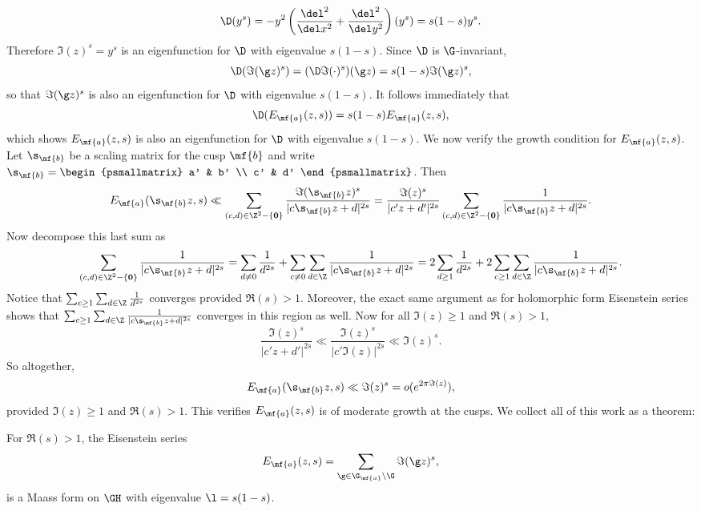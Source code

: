     \[
      \D(y^{s}) = -y^{2}\left(\frac{\del^{2}}{\del x^{2}}+\frac{\del^{2}}{\del y^{2}}\right)(y^{s}) = s(1-s)y^{s}.
    \]
    Therefore $\Im(z)^{s} = y^{s}$ is an eigenfunction for $\D$ with eigenvalue $s(1-s)$. Since $\D$ is $\G$-invariant,
    \[
      \D(\Im(\g z)^{s}) = (\D\Im(\cdot)^{s})(\g z) = s(1-s)\Im(\g z)^{s},
    \]
    so that $\Im(\g z)^{s}$ is also an eigenfunction for $\D$ with eigenvalue $s(1-s)$. It follows immediately that
    \[
      \D(E_{\mf{a}}(z,s)) = s(1-s)E_{\mf{a}}(z,s),
    \]
    which shows $E_{\mf{a}}(z,s)$ is also an eigenfunction for $\D$ with eigenvalue $s(1-s)$. We now verify the growth condition for $E_{\mf{a}}(z,s)$. Let $\s_{\mf{b}}$ be a scaling matrix for the cusp $\mf{b}$ and write $\s_{\mf{b}} = \begin{psmallmatrix} a' & b' \\ c' & d' \end{psmallmatrix}$. Then
    \[
      E_{\mf{a}}(\s_{\mf{b}}z,s) \ll \sum_{(c,d) \in \Z^{2}-\{\mathbf{0}\}}\frac{\Im(\s_{\mf{b}}z)^{s}}{|c\s_{\mf{b}}z+d|^{2s}} = \frac{\Im(z)^{s}}{|c'z+d'|^{2s}}\sum_{(c,d) \in \Z^{2}-\{\mathbf{0}\}}\frac{1}{|c\s_{\mf{b}}z+d|^{2s}}.
    \]
    Now decompose this last sum as
    \[
      \sum_{(c,d) \in \Z^{2}-\{\mathbf{0}\}}\frac{1}{|c\s_{\mf{b}}z+d|^{2s}} = \sum_{d \neq 0}\frac{1}{d^{2s}}+\sum_{c \neq 0}\sum_{d \in \Z}\frac{1}{|c\s_{\mf{b}}z+d|^{2s}} = 2\sum_{d \ge 1}\frac{1}{d^{2s}}+2\sum_{c \ge 1}\sum_{d \in \Z}\frac{1}{|c\s_{\mf{b}}z+d|^{2s}}.
    \]
    Notice that $\sum_{c \ge 1}\sum_{d \in \Z}\frac{1}{d^{2s}}$ converges provided $\Re(s) > 1$. Moreover, the exact same argument as for holomorphic form Eisenstein series shows that $\sum_{c \ge 1}\sum_{d \in \Z}\frac{1}{|c\s_{\mf{b}}z+d|^{2s}}$ converges in this region as well. Now for all $\Im(z) \ge 1$ and $\Re(s) > 1$,
    \[
      \frac{\Im(z)^{s}}{|c'z+d'|^{2s}} \ll \frac{\Im(z)^{s}}{|c'\Im(z)|^{2s}} \ll \Im(z)^{s}.
    \]
    So altogether,
    \[
      E_{\mf{a}}(\s_{\mf{b}}z,s) \ll \Im(z)^{s} = o(e^{2\pi\Im(z)}),
    \]
    provided $\Im(z) \ge 1$ and $\Re(s) > 1$. This verifies $E_{\mf{a}}(z,s)$ is of moderate growth at the cusps. We collect all of this work as a theorem:

    \begin{theorem}
      For $\Re(s) > 1$, the Eisenstein series
      \[
          E_{\mf{a}}(z,s) = \sum_{\g \in \G_{\mf{a}}\backslash\G}\Im(\g z)^{s},
      \]
      is a Maass form on $\GH$ with eigenvalue $\l = s(1-s)$.
    \end{theorem}

